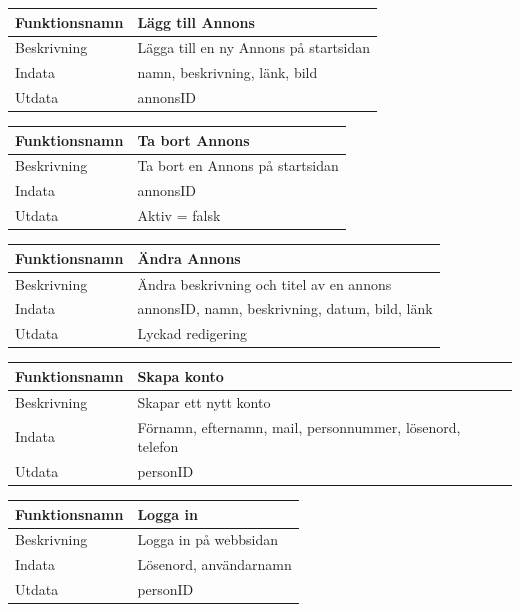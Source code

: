 \documentclass[11pt, titlepage, oneside, a4paper]{article}	%
\begin{document}
\begin{tabular}{ll}
\hline
Funktionsnamn & Lägg till Annons                        \\ \hline
Beskrivning   & Lägga till en ny Annons på startsidan \\ \hline
Indata        & namn, beskrivning, länk, bild         \\ \hline
Utdata        & annonsID                              \\ \hline
\end{tabular}

\begin{tabular}{ll}
\hline
Funktionsnamn & Ta bort Annons                        \\ \hline
Beskrivning   & Ta bort en Annons på startsidan \\ \hline
Indata        & annonsID         \\ \hline
Utdata        & Aktiv = falsk                              \\ \hline
\end{tabular}

\begin{tabular}{ll}
\hline
Funktionsnamn & Ändra Annons                       \\ \hline
Beskrivning   & Ändra beskrivning och titel av en annons \\ \hline
Indata        & annonsID, namn, beskrivning, datum, bild, länk   \\ \hline
Utdata        & Lyckad redigering                             \\ \hline
\end{tabular}

\begin{tabular}{ll}
\hline
Funktionsnamn & Skapa konto                     \\ \hline
Beskrivning   & Skapar ett nytt konto \\ \hline
Indata        & Förnamn, efternamn, mail, personnummer, lösenord, telefon   \\ \hline
Utdata        & personID              \\ \hline
\end{tabular}

\begin{tabular}{ll}
\hline
Funktionsnamn & Logga in                     \\ \hline
Beskrivning   & Logga in på webbsidan \\ \hline
Indata        & Lösenord, användarnamn   \\ \hline
Utdata        & personID              \\ \hline
\end{tabular}
\end{document}
